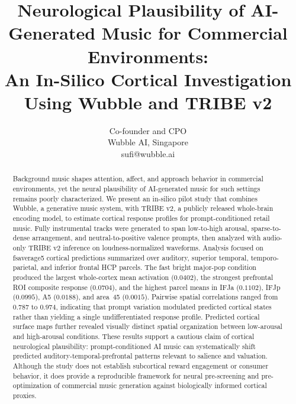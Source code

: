 \documentclass[conference]{IEEEtran}
\begin{document}
\title{Neurological Plausibility of AI-Generated Music for Commercial Environments:\\
An In-Silico Cortical Investigation Using Wubble and TRIBE v2}

\author{
Co-founder and CPO \\
Wubble AI, Singapore \\
sufi@wubble.ai}

\maketitle

\begin{abstract}
Background music shapes attention, affect, and approach behavior in commercial environments, yet the neural plausibility of AI-generated music for such settings remains poorly characterized. We present an in-silico pilot study that combines Wubble, a generative music system, with TRIBE v2, a publicly released whole-brain encoding model, to estimate cortical response profiles for prompt-conditioned retail music. Fully instrumental tracks were generated to span low-to-high arousal, sparse-to-dense arrangement, and neutral-to-positive valence prompts, then analyzed with audio-only TRIBE v2 inference on loudness-normalized waveforms. Analysis focused on fsaverage5 cortical predictions summarized over auditory, superior temporal, temporo-parietal, and inferior frontal HCP parcels. The fast bright major-pop condition produced the largest whole-cortex mean activation ($0.0402$), the strongest prefrontal ROI composite response ($0.0704$), and the highest parcel means in IFJa ($0.1102$), IFJp ($0.0995$), A5 ($0.0188$), and area~45 ($0.0015$). Pairwise spatial correlations ranged from $0.787$ to $0.974$, indicating that prompt variation modulated predicted cortical states rather than yielding a single undifferentiated response profile. Predicted cortical surface maps further revealed visually distinct spatial organization between low-arousal and high-arousal conditions. These results support a cautious claim of cortical neurological plausibility: prompt-conditioned AI music can systematically shift predicted auditory-temporal-prefrontal patterns relevant to salience and valuation. Although the study does not establish subcortical reward engagement or consumer behavior, it does provide a reproducible framework for neural pre-screening and pre-optimization of commercial music generation against biologically informed cortical proxies.
\end{abstract}
\end{document}
